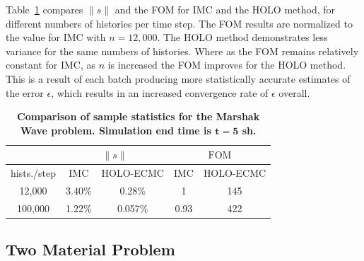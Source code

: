 \documentclass[12pt]{article}
\renewcommand{\ss}{\ensuremath{\|s\|}}
\newcommand{\FOM}{\ensuremath{\text{FOM}}}
\begin{document}
\begin{center}
Table~\ref{marshak_var} compares $\ss$ and the FOM for IMC and the HOLO method, for different
numbers of histories per time step. The FOM results are normalized to the value for IMC with
$n=12,000$.  The HOLO method demonstrates less variance
for the same numbers of histories.  Where as the FOM remains relatively constant for
IMC, as $n$ is increased the FOM improves for the HOLO method.  This is a result of
each batch producing more statistically accurate estimates of the error $\epsilon$,
which results in an increased convergence rate of $\epsilon$ overall.  
\begin{table}[H]
\centering
\caption{\label{marshak_var} \textbf{Comparison of sample statistics for the Marshak Wave problem.   Simulation end time is $\mathbf{t=5}$ sh.}}
\vspace{-0.1in}
\begin{tabular}{|c|cc|cc|}\cline{2-5}
    \multicolumn{1}{c|}{}       & \multicolumn{2}{|c|}{\ss} &
    \multicolumn{2}{|c|}{\FOM} \\ \hline
hists./step   & IMC & HOLO-ECMC &  IMC & HOLO-ECMC   \\ \hline
   12,000	 & 3.40\%  & 0.28\% &  1    &  145      \\
  100,000    & 1.22\%  & 0.057\% & 0.93    &   422     \\ \hline
\end{tabular}
\end{table}



\subsection{Two Material Problem}
\label{sec:two}


\end{center}
\end{document}
